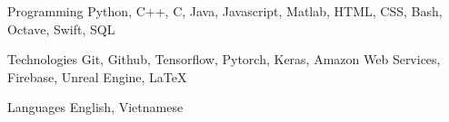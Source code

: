 

\begin{cvskills}

  \cvskill
    {Programming} %
    {Python, C++, C, Java, Javascript, Matlab, HTML, CSS, Bash, Octave, Swift, SQL} %

\cvskill
{Technologies} %
{Git, Github, Tensorflow, Pytorch, Keras, Amazon Web Services, Firebase, Unreal Engine, LaTeX} %

  \cvskill
    {Languages} %
    {English, Vietnamese} %

\end{cvskills}
